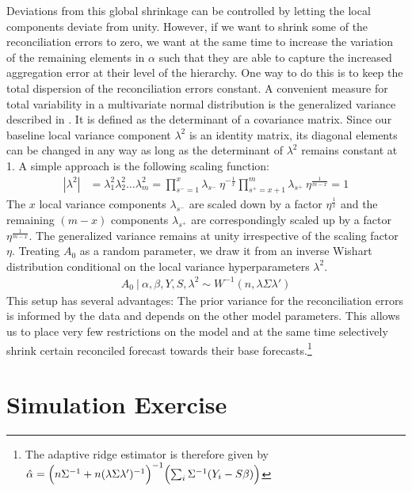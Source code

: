 \documentclass[a4paper,fleqn,11pt]{article}
\begin{document}
\begin{itemize}
    Deviations from this global shrinkage can be controlled by letting the local components deviate from unity. However, if we want to shrink some of the reconciliation errors to zero, we want at the same time to increase the variation of the remaining elements in $\alpha$ such that they are able to capture the increased aggregation error at their level of the hierarchy. One way to do this is to keep the total dispersion of the reconciliation errors constant. A convenient measure for total variability in a multivariate normal distribution is the generalized variance described in \cite{Mustonen1997}. It is defined as the determinant of a covariance matrix. Since our baseline local variance component $\lambda^2$ is an identity matrix, its diagonal elements can be changed in any way as long as the determinant of $\lambda^2$ remains constant at 1. A simple approach is the following scaling function:
    \begin{align*}
   	|\lambda^2| &= \lambda_1^2 \lambda_2^2 \hdots \lambda_m^2 
   	= \prod_{s^- = 1}^{x} \lambda_{s^-}\ \eta^{-\frac{1}{x}}   \prod_{s^+ = x+1}^{m} \lambda_{s^+}\ \eta^{\frac{1}{m-x}} = 1
    \end{align*}
    The $x$ local variance components $\lambda_{s^-}$ are scaled down by a factor $\eta^{\frac{1}{x}}$ and the remaining $(m-x)$ components $\lambda_{s^+}$ are correspondingly scaled up by a factor $\eta^{\frac{1}{m-x}}$. The generalized variance remains at unity irrespective of the scaling factor $\eta$. Treating $A_0$ as a random parameter, we draw it from an inverse Wishart distribution conditional on the local variance hyperparameters $\lambda^2$. 
    \begin{align}
    	A_0\ |\ \alpha,\beta,Y,S,\lambda^2 \sim W^{-1}\left(n,\lambda \Sigma \lambda'\right)
    \end{align}  
    This setup has several advantages: The prior variance for the reconciliation errors is informed by the data and depends on the other model parameters. This allows us to place very few restrictions on the model and at the same time selectively shrink certain reconciled forecast towards their base forecasts.\footnote{The adaptive ridge estimator is therefore given by $\hat{\alpha} = \Bigl(n \Sigma^{-1} + n (\lambda \Sigma \lambda')^{-1}\Bigr)^{-1} \Bigl(\sum_i \Sigma^{-1} (Y_i - S\beta)\Bigr)$}
   
   
\end{itemize}

\clearpage

\section{Simulation Exercise}
\end{document}
